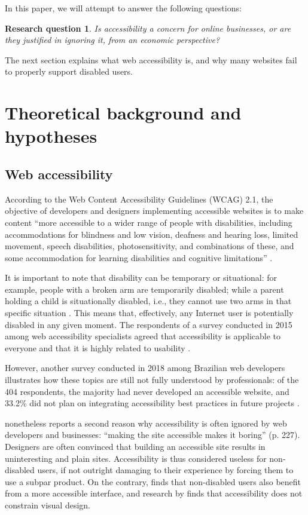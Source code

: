\documentclass[12pt, a4paper]{article}
\newtheorem{req}{Research question}
\begin{document}
In this paper, we will attempt to answer the following questions:

\begin{req}
  Is accessibility a concern for online businesses, or are they justified in ignoring it,
  from an economic perspective?
\end{req}

The next section explains what web accessibility is, and why many websites fail to
properly support disabled users.

\section{Theoretical background and hypotheses}

\subsection{Web accessibility}\label{sec:web-accessibility}

According to the Web Content Accessibility Guidelines (WCAG) 2.1, the objective of
developers and designers implementing accessible websites is to make content ``more
accessible to a wider range of people with disabilities, including accommodations for
blindness and low vision, deafness and hearing loss, limited movement, speech
disabilities, photosensitivity, and combinations of these, and some accommodation for
learning disabilities and cognitive limitations'' \cite[para. 1]{wcag21}.

It is important to note that disability can be temporary or situational: for example,
people with a broken arm are temporarily disabled; while a parent holding a child is
situationally disabled, i.e., they cannot use two arms in that specific situation
\cite{henry2006}. This means that, effectively, any Internet user is potentially
disabled in any given moment. The respondents of a survey conducted in 2015 among web
accessibility specialists agreed that accessibility is applicable to everyone and that
it is highly related to usability \cite{yesilada2015}.

However, another survey conducted in 2018 among Brazilian web developers illustrates
how these topics are still not fully understood by professionals: of the 404
respondents, the majority had never developed an accessible website, and 33.2\% did not
plan on integrating accessibility best practices in future projects
\cite{antonelli2018}.

 nonetheless reports a second reason why accessibility is often
ignored by web developers and businesses: ``making the site accessible makes it
boring'' (p. 227). Designers are often convinced that building an accessible
site results in uninteresting and plain sites. Accessibility is thus considered useless
for non-disabled users, if not outright damaging to their experience by forcing them to
use a subpar product. On the contrary,  finds that
non-disabled users also benefit from a more accessible interface, and research by
 finds that accessibility does not constrain visual design.
\end{document}
